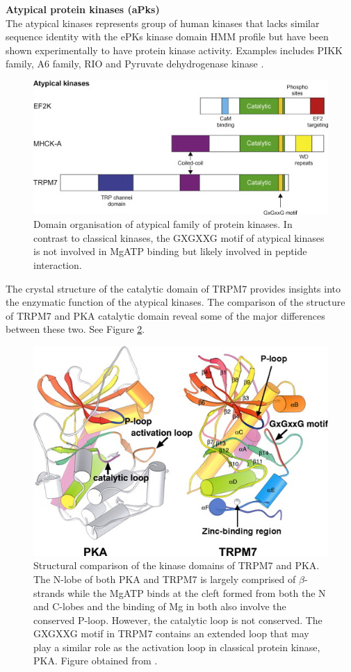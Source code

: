 \documentclass[a4paper, 11pt]{article}
\begin{document}
\textbf{Atypical protein kinases (aPks)}\\
The atypical kinases represents group of human kinases that lacks similar sequence identity with the ePKs kinase domain HMM profile but have been shown experimentally to have protein kinase activity. Examples includes PIKK family, A6 family, RIO and Pyruvate dehydrogenase kinase \cite{manning2002protein}.\\ 
\begin{figure}[H]
	\includegraphics[width=.8\linewidth]{figures/atypical.jpg}
	\centering
	\caption{Domain organisation of atypical family of protein kinases. In contrast to classical kinases, the GXGXXG motif of atypical kinases is not involved in MgATP binding but likely involved in peptide interaction.}
	\label{atypical}
\end{figure}
The crystal structure of the catalytic domain of TRPM7 provides insights into the enzymatic function of the atypical kinases. The comparison of the structure of TRPM7 and PKA catalytic domain reveal some of the major differences between these two. See Figure \ref{atypical2}. 
\begin{figure}[H]
	\includegraphics[width=.6\linewidth]{figures/atypical2.jpg}
	\centering
	\caption{Structural comparison of the kinase domains of TRPM7 and PKA. The N-lobe of both PKA and TRPM7 is largely comprised of $\beta$-strands while the MgATP binds at the cleft formed from both the N and C-lobes and the binding of Mg in both also involve the conserved P-loop. However, the catalytic loop is not conserved. The GXGXXG motif in TRPM7 contains an extended loop that may play a similar role as the activation loop in classical protein kinase, PKA. Figure obtained from \cite{wiseman2010ef2k}.} 
	\label{atypical2}
\end{figure}
\end{document}
